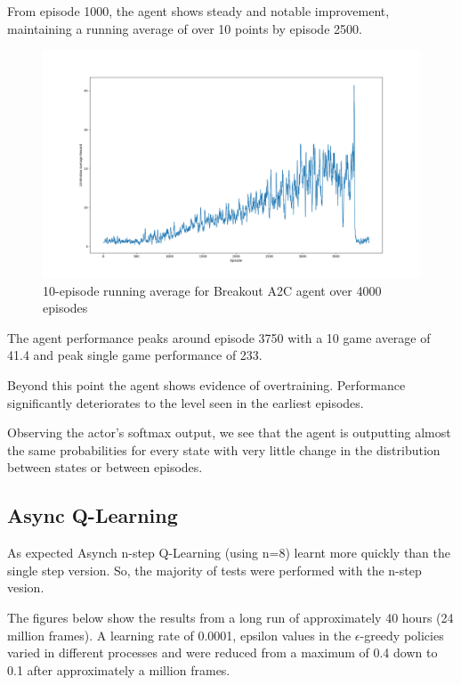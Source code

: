 \documentclass{article}
\begin{document}
From episode 1000, the agent shows steady and notable improvement, maintaining a running average of over 10 points by episode 2500.

\begin{figure}
\centering
\captionsetup{width=.8\linewidth}
\vspace*{-1cm}
\includegraphics[width=.98\linewidth]{A2C4000.png}
\caption{10-episode running average for Breakout A2C agent over 4000 episodes}
\end{figure}


 The agent performance peaks around episode 3750 with a 10 game average of 41.4 and peak single game performance of 233. 
 
 Beyond this point the agent shows evidence of overtraining. Performance significantly deteriorates to the level seen in the earliest episodes. 
 
 Observing the actor's softmax output, we see that the agent is outputting almost the same probabilities for every state with very little change in the distribution between states or between episodes.

\subsection{Async Q-Learning}

As expected Asynch n-step Q-Learning (using n=8) learnt more quickly than the single step version. So, the majority of tests were performed with the n-step vesion.

The figures below show the results from a long run of approximately 40 hours (24 million frames). A learning rate of 0.0001, epsilon values in the $\epsilon$-greedy policies varied in different processes and were reduced from a maximum of 0.4 down to 0.1 after approximately a million frames.
\end{document}
